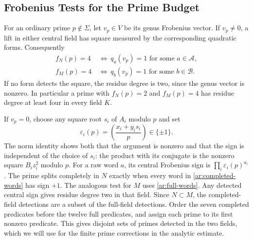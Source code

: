 \subsection{Frobenius Tests for the Prime Budget}\label{ar:frobenius}
For an ordinary prime $p\notin\Sigma$, let $v_p\in V$ be its genus
Frobenius vector. If $v_p\ne0$, a lift in either central field has square
measured by the corresponding quadratic forms. Consequently
\begin{equation}\label{ar:nonsplit-test}
 \begin{aligned}
 f_N(p)=4&\ \Longleftrightarrow\ q_a(v_p)=1\text{ for some }a\in\mathcal A,\\
 f_M(p)=4&\ \Longleftrightarrow\ q_b(v_p)=1\text{ for some }b\in\mathcal B.
 \end{aligned}
\end{equation}
If no form detects the square, the residue degree is two, since the
genus vector is nonzero. In particular a prime with $f_N(p)=2$ and
$f_M(p)=4$ has residue degree at least four in every field $K$.

If $v_p=0$, choose any square root $s_i$ of $A_i$ modulo $p$ and set
\[
 \varepsilon_i(p)=\left(\frac{x_i+y_i s_i}{p}\right)\in\{\pm1\}.
\]
The norm identity shows both that the argument is nonzero and that the
sign is independent of the choice of $s_i$: the product with its
conjugate is the nonzero square $B_i z_i^2$ modulo $p$.
For a raw word $a$, its central Frobenius sign is
$\prod_i\varepsilon_i(p)^{a_i}$. The prime splits completely in $N$
exactly when every word in \eqref{ar:completed-words} has sign $+1$.
The analogous test for $M$ uses \eqref{ar:full-words}. Any detected
central sign gives residue degree two in that field. Since $N\subset M$,
the completed-field detections are a subset of the full-field detections.
Order the seven completed predicates before the twelve full predicates,
and assign each prime to its first nonzero predicate. This gives
disjoint sets of primes detected in the two fields, which we will use
for the finite prime corrections in the analytic estimate.

